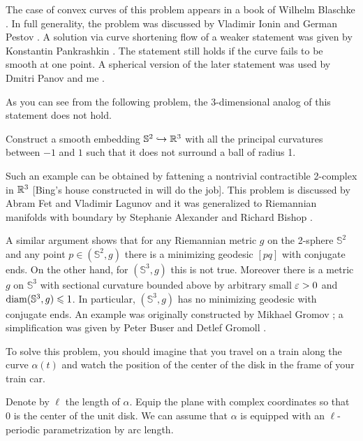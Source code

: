 The case of convex curves of this problem appears in a book of Wilhelm Blaschke \cite[see \S 24 in][]{blaschke}.
In full generality, the problem was discussed by Vladimir Ionin and German Pestov \cite{pestov-ionin}. %
A solution via curve shortening flow of a weaker statement 
was given by Konstantin Pankrashkin \cite{pankrashkin}.
The statement still holds if the curve fails to be smooth at one point.
A spherical version of the later statement 
was used by Dmitri Panov and me \cite{panov-petrunin-ramification}.

As you can see from the following problem, the 3-dimensional analog of this statement does not hold.

\begin{pr}
Construct a smooth embedding $\mathbb{S}^2\hookrightarrow \mathbb{R}^3$ 
with all the principal curvatures between $-1$ and $1$
such that it does not surround a ball of radius 1.
\end{pr}

Such an example can be obtained by fattening a nontrivial contractible 2-complex in $\mathbb{R}^3$ 
[Bing's house constructed in  will do the job].
This problem is discussed by Abram Fet and Vladimir Lagunov \cite{lagunov-2,lagunov-fet} 
and it was generalized to Riemannian manifolds with boundary by Stephanie Alexander and Richard Bishop \cite{alexander-bishop}.

A similar argument shows that for any Riemannian metric $g$ on the 2-sphere $\mathbb S^2$ 
and any point $p\in(\mathbb S^2,g)$ there is a minimizing geodesic $[pq]$ with conjugate ends.
On the other hand, for $(\mathbb S^3,g)$ this is not true.
Moreover there is a metric $g$ on $\mathbb{S}^3$ 
with sectional curvature bounded above by arbitrary small $\varepsilon>0$ and $\operatorname{\rm diam}\nolimits(\mathbb{S}^3,g)\leqslant 1$.
In particular, $(\mathbb S^3,g)$ has no minimizing geodesic with conjugate ends.
An example was originally constructed by Mikhael Gromov \cite{gromov-almost-flat}; 
a simplification was given by 
Peter Buser
and Detlef Gromoll \cite{buser-gromoll}.

To solve this problem,
you should imagine that you travel on a train along the curve $\alpha(t)$
and watch the position of the center of the disk in the frame of your train car.

\medskip

Denote by $\ell$ the length of $\alpha$.
Equip the plane with complex coordinates so that $0$ is the center of the unit disk.
We can assume that $\alpha$ is equipped with an $\ell$-periodic parametrization by arc length.

